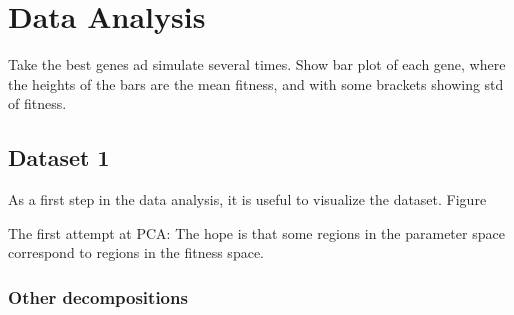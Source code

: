 
\chapter{Data Analysis} %

\label{chapter:model} %
	

Take the best genes ad simulate several times. Show bar plot of each gene, where the heights of the bars are the mean fitness, and with some brackets showing std of fitness.

\section{Dataset 1}

As a first step in the data analysis, it is useful to visualize the dataset. Figure 

The first attempt at PCA: The hope is that some regions in the parameter space correspond to regions in the fitness space. 
\begin{comment}
\begin{figure}
	\centering
	\subcaptionbox{\label{subfig:}}
	[0.49\linewidth]{\texttt{[image: issue\_21\_b.png]}}
	\subcaptionbox{\label{subfig:}}
	[0.49\linewidth]{\texttt{[image: issue\_21\_c.png]}}
	\subcaptionbox{\label{subfig:}}
	[0.49\linewidth]{\texttt{[image: issue\_21\_d.png]}}
	\subcaptionbox{\label{subfig:}}
	[0.49\linewidth]{\texttt{[image: issue\_21\_e.png]}}

	\caption{Scatter plots for dataset 1}\label{fig:scatter_plot_dataset1}
	\label{sub:other_decompositions}
\end{figure}


\end{comment}





\subsection{Other decompositions} %